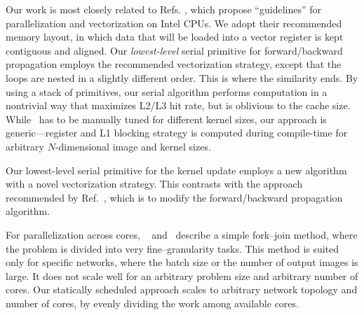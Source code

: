   Our work is most closely related to Refs.
  \cite{chellapilla2006high,das2016distributed}, which propose
  ``guidelines'' for parallelization and vectorization on Intel CPUs.
  We adopt their recommended memory layout, in which data that will be
  loaded into a vector register is kept contiguous and aligned.  Our
  \emph{lowest-level} serial primitive for forward/backward
  propagation employs the recommended vectorization strategy, except
  that the loops are nested in a slightly different order.  This is
  where the similarity ends.  By using a stack of primitives, our
  serial algorithm performs computation in a nontrivial way that
  maximizes L2/L3 hit rate, but is oblivious to the cache size.
  While~\cite{chellapilla2006high} has to be manually tuned for
  different kernel sizes, our approach is generic---register and L1
  blocking strategy is computed during compile-time for arbitrary
  $N$-dimensional image and kernel sizes.

  Our lowest-level serial primitive for the kernel update employs a
  new algorithm with a novel vectorization strategy. This contrasts
  with the approach recommended by Ref.~\cite{chellapilla2006high},
  which is to modify the forward/backward propagation algorithm.

  For parallelization across cores,  ~\cite{chellapilla2006high} and~\cite{das2016distributed} describe a simple fork--join method, where the
  problem is divided into very fine--granularity tasks.
  This method is suited only for specific networks, where the batch
  size or the number of output images is large.  It does not scale
  well for an arbitrary problem size and arbitrary number of cores.
  Our statically scheduled approach scales to arbitrary network
  topology and number of cores, by evenly dividing the work among
  available cores.


